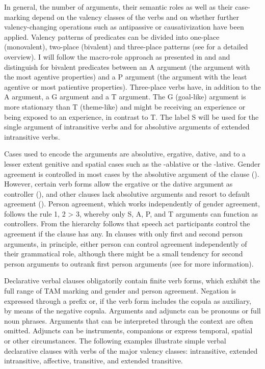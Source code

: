 In general, the number of arguments, their semantic roles as well as their case-marking depend on the valency classes of the verbs and on whether further valency-changing operations such as antipassive or causativization have been applied. Valency patterns of predicates can be divided into one-place (monovalent), two-place (bivalent) and three-place patterns (see  for a detailed overview). I will follow the macro-role approach as presented in \citet{Bickel2011} and \citet{Bickel.etal2015} and distinguish for bivalent predicates between an A argument (the argument with the most agentive properties) and a P argument (the argument with the least agentive or most patientive properties). Three-place verbs have, in addition to the A argument, a G argument and a T argument. The G (goal-like) argument is more stationary than T (theme-like) and might be receiving an experience or being exposed to an experience, in contrast to T. The label S will be used for the single argument of intransitive verbs and for absolutive arguments of extended intransitive verbs.

Cases used to encode the arguments are absolutive, ergative, dative, and to a lesser extent genitive and spatial cases such as the -ablative or the -lative. Gender agreement is controlled in most cases by the absolutive argument of the clause (). However, certain verb forms allow the ergative or the dative argument as controller (), and other clauses lack absolutive arguments and resort to default agreement (). Person agreement, which works  independently of gender agreement, follows the rule 1, 2 > 3, whereby only S, A, P, and T arguments can function as controllers. From the hierarchy follows that speech act participants control the agreement if the clause has any. In clauses with only first and second person arguments, in principle, either person can control agreement independently of their grammatical role, although there might be a small tendency for second person arguments to outrank first person arguments (see  for more information).

Declarative verbal clauses obligatorily contain finite verb forms, which exhibit the full range of TAM marking and gender and person agreement. Negation is expressed through a prefix or, if the verb form includes the copula as auxiliary, by means of the negative copula. Arguments and adjuncts can be pronouns or full noun phrases. Arguments that can be interpreted through the context are often omitted. Adjuncts can be instruments, companions or express temporal, spatial or other circumstances. The following examples illustrate simple verbal declarative clauses with verbs of the major valency classes: intransitive, extended intransitive, affective, transitive, and extended transitive. 


